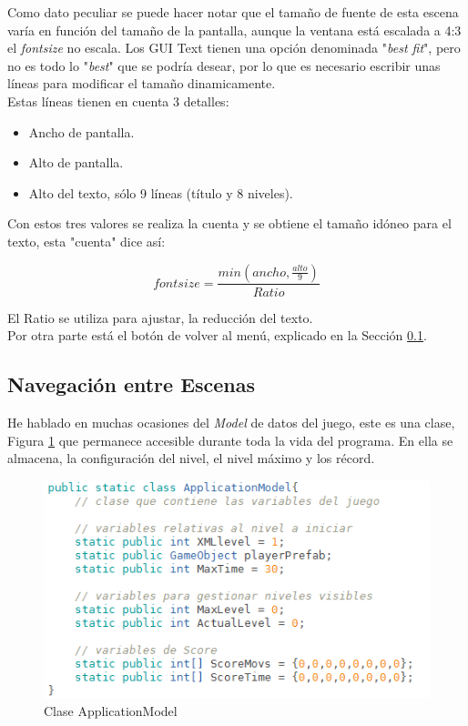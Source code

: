 \documentclass{article}
\begin{document}
Como dato peculiar se puede hacer notar que el tamaño de fuente de esta escena varía en función del tamaño de la pantalla, aunque la ventana está escalada a 4:3 el \emph{fontsize} no escala. Los GUI Text tienen una opción denominada "\emph{best fit}", pero no es todo lo "\emph{best}" que se podría desear, por lo que es necesario escribir unas líneas para modificar el tamaño dinamicamente.\\

Estas líneas tienen en cuenta 3 detalles:
\begin{itemize}
    \item Ancho de pantalla.
    \item Alto de pantalla.
    \item Alto del texto, sólo 9 líneas (título y 8 niveles).
\end{itemize}
Con estos tres valores se realiza la cuenta y se obtiene el tamaño idóneo para el texto, esta "cuenta" dice así:

$$ fontsize = \frac{min( ancho, \frac{alto}{9})}{Ratio} $$

El Ratio se utiliza para ajustar, la reducción del texto.\\

Por otra parte está el botón de volver al menú, explicado en la Sección \ref{subsec:navegacion}.
\newpage
\subsection{Navegación entre Escenas}
\label{subsec:navegacion}

He hablado en muchas ocasiones del \emph{Model} de datos del juego, este es una clase, Figura \ref{fig:model} que permanece accesible durante toda la vida del programa. En ella se almacena, la configuración del nivel, el nivel máximo y los récord. \\

\begin{figure}[h!]
\centering
\includegraphics[scale=.75]{model.png}
\caption{Clase ApplicationModel}
\label{fig:model}
\end{figure}
\end{document}
